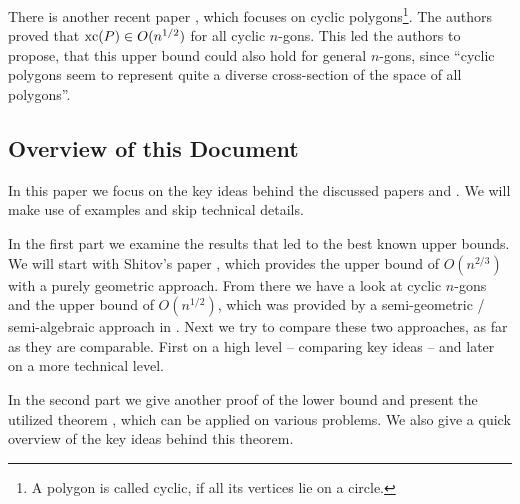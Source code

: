 There is another recent paper \cite{kwan2020extension}, which focuses on cyclic polygons\footnote{A polygon is called cyclic, if all its vertices lie on a circle.}. The authors proved that $\operatorname{xc}(P) \in O(n^{1/2})$ for all cyclic $n$-gons. 
This led the authors to propose, that this upper bound could also hold for general $n$-gons, since ``cyclic polygons seem to represent quite a diverse cross-section of the space of all polygons''.



\subsection{Overview of this Document}

In this paper we focus on the key ideas behind the discussed papers \cite{shitov2020sublinear} and \cite{kwan2020extension}. We will make use of examples and skip technical details.

In the first part we examine the results that led to the best known upper bounds. 
We will start with Shitov's paper \cite{shitov2020sublinear}, which provides the upper bound of $O(n^{2/3})$ with a purely geometric approach.
From there we have a look at cyclic $n$-gons and the upper bound of $O(n^{1/2})$, which was provided by a semi-geometric / semi-algebraic approach in \cite{kwan2020extension}.
Next we try to compare these two approaches, as far as they are comparable. First on a high level -- comparing key ideas -- and later on a more technical level.

In the second part we give another proof of the lower bound and present the utilized theorem \cite[Theorem 1]{averkov2016maximum}, which can be applied on various problems. We also give a quick overview of the key ideas behind this theorem.
